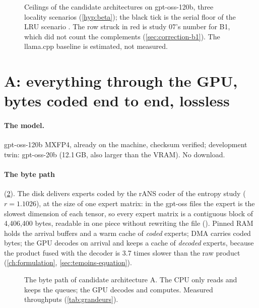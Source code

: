 \begin{figure}[ht]
\centering
\GrapheArchitectures
\caption[Ceilings of the candidate architectures]{Ceilings of the candidate architectures on gpt-oss-120b, three locality scenarios (\cref{hyp:beta}); the black tick is the serial floor of the LRU scenario \calc. The row struck in red is study 07's number for B1, which did not count the complements (\cref{sec:correction-b1}). The llama.cpp baseline is estimated, not measured.}
\label{fig:architectures-plafonds}
\end{figure}

\section{A: everything through the GPU, bytes coded end to end, lossless}\label{sec:archi-a}

\paragraph{The model.} gpt-oss-120b MXFP4, already on the machine, checksum verified; development twin: gpt-oss-20b (12.1\,GB, also larger than the VRAM). No download.

\paragraph{The byte path} (\cref{fig:chemin-a}). The disk delivers experts coded by the rANS coder of the entropy study ($r = 1.1026$), at the size of one expert matrix: in the gpt-oss files the expert is the slowest dimension of each tensor, so every expert matrix is a contiguous block of 4{,}406{,}400 bytes, readable in one piece without rewriting the file \mes{} (). Pinned RAM holds the arrival buffers and a warm cache of \emph{coded} experts; DMA carries coded bytes; the GPU decodes on arrival and keeps a cache of \emph{decoded} experts, because the product fused with the decoder is 3.7 times slower than the raw product (\cref{ch:formulation}, \cref{sec:temoins-equation}).

\begin{figure}[ht]
\centering
\SchemaCheminA
\caption[The byte path of architecture A]{The byte path of candidate architecture A. The CPU only reads and keeps the queues; the GPU decodes and computes. Measured throughputs (\cref{tab:grandeurs}).}
\label{fig:chemin-a}
\end{figure}

